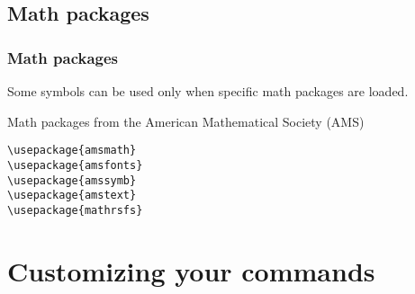 \subsection{Math packages}
\begin{frame}[fragile]
\frametitle{Math packages}

Some symbols can be used only when specific math packages are loaded.

\bigskip

Math packages from the American Mathematical Society (AMS)

\begin{lstlisting}
\usepackage{amsmath}
\usepackage{amsfonts}
\usepackage{amssymb}
\usepackage{amstext}
\usepackage{mathrsfs}
\end{lstlisting}

\end{frame}


\section{Customizing your commands}

